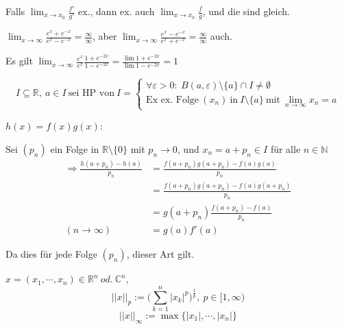 Falls $\lim_{x\rightarrow x_0}\frac{f'}{g'}$ ex., dann ex. auch $\lim_{x\rightarrow x_0}\frac{f}{g}$, und die sind gleich.

\begin{exmp}
$\lim_{x\rightarrow\infty}\frac{e^x+e^{-x}}{e^x-e^{-x}}=\frac{\infty}{\infty}$, aber $\lim_{x\rightarrow\infty}\frac{e^x-e^{-x}}{e^x+e^{-x}}=\frac{\infty}{\infty}$ auch.

Es gilt $\lim_{x\rightarrow\infty}\frac{e^x}{e^x}\frac{1+e^{-2x}}{1-e^{-2x}}=\frac{\lim 1+e^{-2x}}{\lim 1-e^{-2x}}=1$
\end{exmp}

\begin{definition}[HP]
\begin{equation*}
I\subseteq\mathbb{R},\ a\in I\ \mbox{sei HP von}\ I=\left\{
\begin{array}{lcl}
\forall\varepsilon>0:\ B(a,\varepsilon)\setminus\{a\}\cap I\neq\emptyset\\
\mbox{Ex ex. Folge}\ (x_n)\ \mbox{in}\ I\setminus\{a\}\ \mbox{mit}\ \lim_{n\rightarrow\infty}x_n=a
\end{array}
\right.
\end{equation*}
\end{definition}

$h(x)=f(x)g(x)$:

Sei $(p_n)$ ein Folge in $\mathbb{R}\setminus\{0\}$  mit $p_n\rightarrow0$, und $x_n=a+p_n\in I$ für alle $n\in\mathbb{N}$
\begin{align*}
\Rightarrow\frac{h(a+p_n)-h(a)}{p_n}&=\frac{f(a+p_n)g(a+p_n)-f(a)g(a)}{p_n}\\
&=\frac{f(a+p_n)g(a+p_n)-f(a)g(a+p_n)}{p_n}\\
&=g(a+p_n)\frac{f(a+p_n)-f(a)}{p_n}\\
(n\rightarrow\infty)&=g(a)f'(a)
\end{align*}

Da dies für jede Folge $(p_n)$, dieser Art gilt.\\

\begin{definition}[Norm]
$x=(x_1,\cdots,x_n)\in\mathbb{R}^n\ od.\ \mathbb{C}^n$,
\begin{equation*}
||x||_p:=\bigg(\sum_{k=1}^n|x_k|^p\bigg)^{\frac{1}{p}},\ p\in[1,\infty)
\end{equation*}
\begin{equation*}
||x||_\infty:=\max\{|x_1|,\cdots,|x_n|\}
\end{equation*}
\end{definition}

